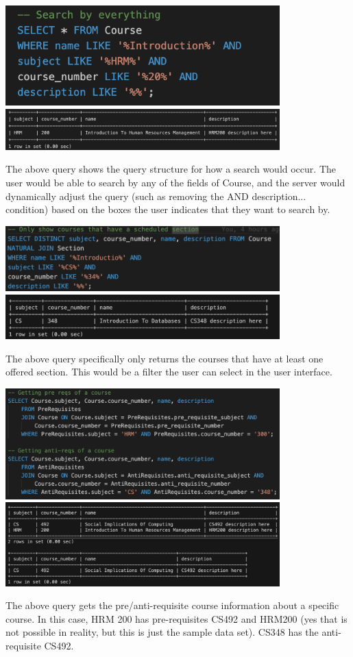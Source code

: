 \documentclass[12pt, a4paper]{article}
\begin{document}
\begin{center}
    \includegraphics[width=400px]{R7/q2}
    \includegraphics[width=400px]{R7/q2out}
\end{center}
The above query shows the query structure for how a search would occur. The user would be able to search by any of the fields of Course, and the server would dynamically adjust the query (such as removing the AND description... condition) based on the boxes the user indicates that they want to search by.
\begin{center}
    \includegraphics[width=400px]{R7/q3}
    \includegraphics[width=400px]{R7/q3out}
\end{center}
The above query specifically only returns the courses that have at least one offered section. This would be a filter the user can select in the user interface.
\begin{center}
    \includegraphics[width=400px]{R7/q4}
    \includegraphics[width=400px]{R7/q4out}
\end{center}
The above query gets the pre/anti-requisite course information about a specific course. In this case, HRM 200 has pre-requisites CS492 and HRM200 (yes that is not possible in reality, but this is just the sample data set). CS348 has the anti-requisite CS492.
\end{document}
